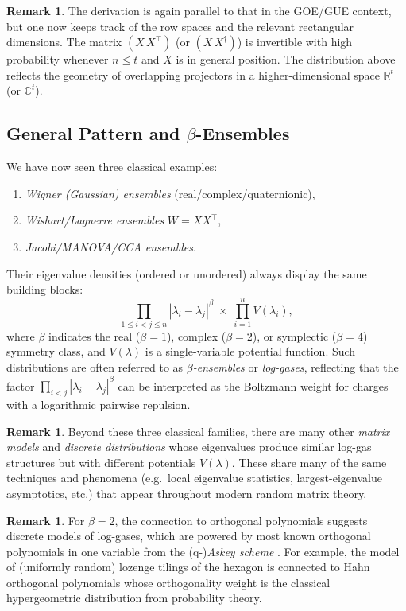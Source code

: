 \documentclass[letterpaper,11pt,oneside,reqno]{article}
\numberwithin{equation}{section}
\theoremstyle{definition}
\newtheorem{remark}[proposition]{Remark}
\begin{document}
\begin{remark}
The derivation is again parallel to that in the GOE/GUE context, but one now keeps track of the row spaces and the relevant rectangular dimensions.  The matrix \((X\,X^\top)\) (or \((X\,X^\dagger)\)) is invertible with high probability whenever \(n\le t\) and \(X\) is in general position.  The distribution above reflects the geometry of overlapping projectors in a higher-dimensional space \(\mathbb{R}^t\) (or \(\mathbb{C}^t\)).
\end{remark}


\subsection{General Pattern and \texorpdfstring{\(\beta\)}{beta}-Ensembles}
\label{sec:general_pattern_log_gas}

We have now seen three classical examples:
\begin{enumerate}[\(\bullet\)]
\item \emph{Wigner (Gaussian) ensembles} (real/complex/quaternionic),
\item \emph{Wishart/Laguerre ensembles} \(W = X X^\top\),
\item \emph{Jacobi/MANOVA/CCA ensembles}.
\end{enumerate}
Their eigenvalue densities (ordered or unordered) always display the same building blocks:
\[
  \prod_{1\le i<j\le n}
  |\lambda_i - \lambda_j|^{\beta}
  \;\times\;
  \prod_{i=1}^n V(\lambda_i),
\]
where \(\beta\) indicates the real (\(\beta=1\)), complex (\(\beta=2\)), or symplectic (\(\beta=4\)) symmetry class, and \(V(\lambda)\) is a single-variable potential function.
Such distributions are often referred to as \emph{\(\beta\)-ensembles} or \emph{log-gases}, reflecting that the factor \(\prod_{i<j}|\lambda_i - \lambda_j|^\beta\) can be interpreted as the Boltzmann weight for charges with a logarithmic pairwise repulsion.

\begin{remark}
	Beyond these three classical families, there are many other \emph{matrix models}
and \emph{discrete distributions}
whose eigenvalues produce similar log-gas structures but with different potentials \(V(\lambda)\).  These share many of the same techniques and phenomena (e.g.\ local eigenvalue statistics, largest-eigenvalue asymptotics, etc.) that appear throughout modern random matrix theory.
\end{remark}

\begin{remark}
For $\beta=2$, the connection to orthogonal polynomials
suggests discrete models of log-gases, which are powered by most
known orthogonal polynomials in one variable from the
(q-)\emph{Askey scheme} \cite{Koekoek1996}. For example,
the model of (uniformly random) lozenge tilings of the hexagon is
connected to Hahn orthogonal polynomials \cite{gorin2021lectures}
whose orthogonality weight is the classical
hypergeometric distribution from probability theory.
\end{remark}
\end{document}

